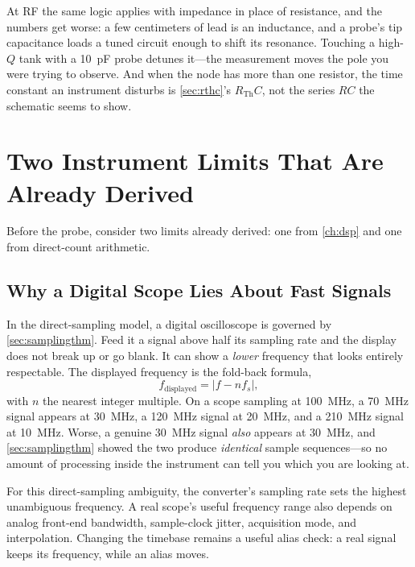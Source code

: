 At RF the same logic applies with impedance in place of resistance, and the numbers
get worse: a few centimeters of lead is an inductance, and a probe's tip capacitance
loads a tuned circuit enough to shift its resonance. Touching a high-\(Q\) tank with
a \SI{10}{\pico\farad} probe detunes it---the measurement moves the pole you were
trying to observe.
And when the node has more than one resistor, the time constant an instrument
disturbs is \cref{sec:rthc}'s \(R_{\mathrm{Th}}C\), not the series \(RC\) the
schematic seems to show.

\section{Two Instrument Limits That Are Already Derived}
\label{sec:instrumentlimits}
Before the probe, consider two limits already derived: one from \cref{ch:dsp} and one
from direct-count arithmetic.

\subsection{Why a Digital Scope Lies About Fast Signals}
In the direct-sampling model, a digital oscilloscope is governed by
\cref{sec:samplingthm}. Feed it a signal above half its sampling rate and the display
does not break up or go blank. It can show a \emph{lower} frequency that looks
entirely respectable. The displayed frequency is the fold-back formula,
\[
f_{\text{displayed}}=\left|f-nf_s\right|,
\]
with \(n\) the nearest integer multiple. On a scope sampling at
\SI{100}{\mega\hertz}, a \SI{70}{\mega\hertz} signal appears at
\SI{30}{\mega\hertz}, a \SI{120}{\mega\hertz} signal at \SI{20}{\mega\hertz}, and a
\SI{210}{\mega\hertz} signal at \SI{10}{\mega\hertz}. Worse, a genuine
\SI{30}{\mega\hertz} signal \emph{also} appears at \SI{30}{\mega\hertz}, and
\cref{sec:samplingthm} showed the two produce \emph{identical} sample sequences---so
no amount of processing inside the instrument can tell you which you are looking at.

For this direct-sampling ambiguity, the converter's sampling rate sets the highest
unambiguous frequency. A real scope's useful frequency range also depends on analog
front-end bandwidth, sample-clock jitter, acquisition mode, and interpolation. Changing
the timebase remains a useful alias check: a real signal keeps its frequency, while an
alias moves.

